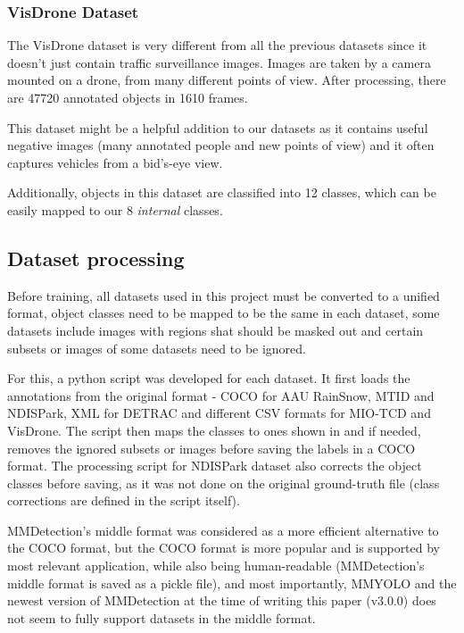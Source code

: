 \subsubsection*{VisDrone Dataset}

The VisDrone dataset \cite{Zhu2022} is very different from all the previous
datasets since it doesn't just contain traffic surveillance images. Images are
taken by a camera mounted on a drone, from many different points of view. After
processing, there are \num{47720} annotated objects in \num{1610} frames.

This dataset might be a helpful addition to our datasets as it contains useful
negative images (many annotated people and new points of view) and it often
captures vehicles from a bid's-eye view.

Additionally, objects in this dataset are classified into 12 classes, which can
be easily mapped to our 8 \textit{internal} classes.


\subsection{Dataset processing}


Before training, all datasets used in this project must be converted to a
unified format, object classes need to be mapped to be the same in each dataset,
some datasets include images with regions shat should be masked out and certain
subsets or images of some datasets need to be ignored.

For this, a python script was developed for each dataset. It first loads the
annotations from the original format - COCO  for AAU RainSnow, MTID
and NDISPark, XML for DETRAC and different CSV formats for MIO-TCD and VisDrone.
The script then maps the classes to ones shown in  and if needed,
removes the ignored subsets or images before saving the labels in a COCO format.
The processing script for NDISPark dataset also corrects the object classes
before saving, as it was not done on the original ground-truth  file (class corrections are defined in the script itself).

MMDetection's middle format was considered as a more efficient alternative to
the COCO format, but the COCO format is more popular and is supported by most
relevant application, while also being human-readable (MMDetection's middle
format is saved as a pickle  file), and most importantly, MMYOLO
and the newest version of MMDetection at the time of writing this paper (v3.0.0)
does not seem to fully support datasets in the middle format.

